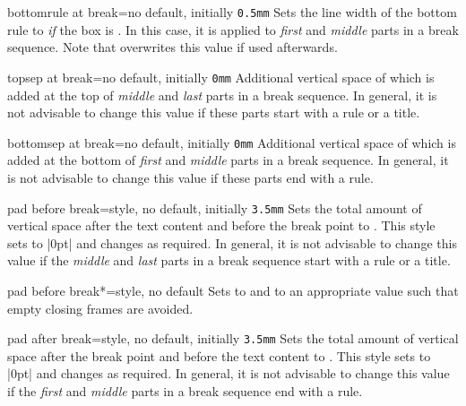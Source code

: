 \begin{docTcbKey}{bottomrule at break}{=}{no default, initially \texttt{0.5mm}}
  Sets the line width of the bottom rule to  \emph{if} the box is .
  In this case, it is applied to \emph{first} and \emph{middle} parts in a
  break sequence. Note that  overwrites this value
  if used afterwards.
\end{docTcbKey}


\begin{docTcbKey}{topsep at break}{=}{no default, initially \texttt{0mm}}
  Additional vertical space of  which is added at the top of
  \emph{middle} and \emph{last} parts in a break sequence. In general,
  it is not advisable to change this value if these parts start with a rule or a title.
\end{docTcbKey}

\begin{docTcbKey}{bottomsep at break}{=}{no default, initially \texttt{0mm}}
  Additional vertical space of  which is added at the bottom of
  \emph{first} and \emph{middle} parts in a break sequence.
  In general, it is not advisable to change this value if these parts end with a rule.
\end{docTcbKey}

\begin{docTcbKey}{pad before break}{=}{style, no default, initially \texttt{3.5mm}}
  Sets the total amount of vertical space after the text content and before the
  break point to . This style sets  to |0pt|
  and changes  as required.
  In general, it is not advisable to change this value if the
  \emph{middle} and \emph{last} parts in a break sequence start with a rule or a title.
\end{docTcbKey}

\begin{docTcbKey}{pad before break*}{=}{style, no default}
  Sets  to  and
   to an appropriate value such that
  empty closing frames are avoided.
\end{docTcbKey}

\begin{docTcbKey}{pad after break}{=}{style, no default, initially \texttt{3.5mm}}
  Sets the total amount of vertical space after the break point and before the
  text content to . This style sets  to |0pt|
  and changes  as required.
  In general, it is not advisable to change this value if the
  \emph{first} and \emph{middle} parts in a break sequence end with a rule.
\end{docTcbKey}

